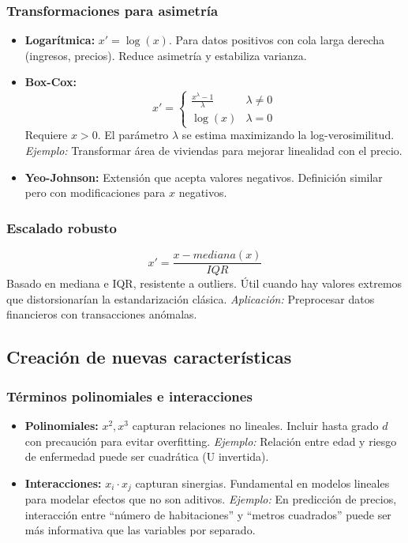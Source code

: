 \documentclass[12pt,a4paper,openany,oneside]{book}
\begin{document}
\subsubsection{Transformaciones para asimetría}
\begin{itemize}
    \item \textbf{Logarítmica:} $x' = \log(x)$. Para datos positivos con cola larga derecha (ingresos, precios). Reduce asimetría y estabiliza varianza.
    \item \textbf{Box-Cox:}
    \[
    x' = 
    \begin{cases}
    \frac{x^\lambda - 1}{\lambda} & \lambda \neq 0 \\
    \log(x) & \lambda = 0
    \end{cases}
    \]
    Requiere $x > 0$. El parámetro $\lambda$ se estima maximizando la log-verosimilitud. \textit{Ejemplo:} Transformar área de viviendas para mejorar linealidad con el precio.
    \item \textbf{Yeo-Johnson:} Extensión que acepta valores negativos. Definición similar pero con modificaciones para $x$ negativos.
\end{itemize}

\subsubsection{Escalado robusto}
\[
x' = \frac{x - mediana(x)}{IQR}
\]
Basado en mediana e IQR, resistente a outliers. Útil cuando hay valores extremos que distorsionarían la estandarización clásica. \textit{Aplicación:} Preprocesar datos financieros con transacciones anómalas.

\subsection{Creación de nuevas características}

\subsubsection{Términos polinomiales e interacciones}
\begin{itemize}
    \item \textbf{Polinomiales:} $x^2, x^3$ capturan relaciones no lineales. Incluir hasta grado $d$ con precaución para evitar overfitting. \textit{Ejemplo:} Relación entre edad y riesgo de enfermedad puede ser cuadrática (U invertida).
    \item \textbf{Interacciones:} $x_i \cdot x_j$ capturan sinergias. Fundamental en modelos lineales para modelar efectos que no son aditivos. \textit{Ejemplo:} En predicción de precios, interacción entre ``número de habitaciones'' y ``metros cuadrados'' puede ser más informativa que las variables por separado.
\end{itemize}
\end{document}
